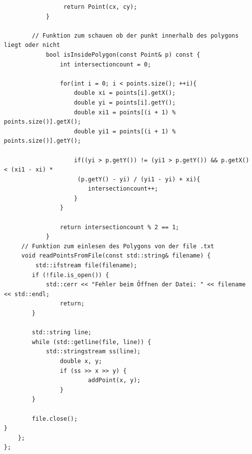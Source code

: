 \documentclass{article}
\begin{document}
\begin{verbatim}
		         return Point(cx, cy);
			}

		// Funktion zum schauen ob der punkt innerhalb des polygons liegt oder nicht
			bool isInsidePolygon(const Point& p) const {
				int intersectioncount = 0;

				for(int i = 0; i < points.size(); ++i){
					double xi = points[i].getX();
					double yi = points[i].getY();
					double xi1 = points[(i + 1) % points.size()].getX();
					double yi1 = points[(i + 1) % points.size()].getY();

					if((yi > p.getY()) != (yi1 > p.getY()) && p.getX() < (xi1 - xi) *
					 (p.getY() - yi) / (yi1 - yi) + xi){
						intersectioncount++;
					}
				}

				return intersectioncount % 2 == 1;
			}
	 // Funktion zum einlesen des Polygons von der file .txt
	 void readPointsFromFile(const std::string& filename) {
		 std::ifstream file(filename);
		if (!file.is_open()) {
			std::cerr << "Fehler beim Öffnen der Datei: " << filename << std::endl;
				return;
		}

		std::string line;
		while (std::getline(file, line)) {
			std::stringstream ss(line);
				double x, y;
				if (ss >> x >> y) {
						addPoint(x, y);
				}
		}

		file.close();
}
	};
};
\end{verbatim}
\newpage
\end{document}
